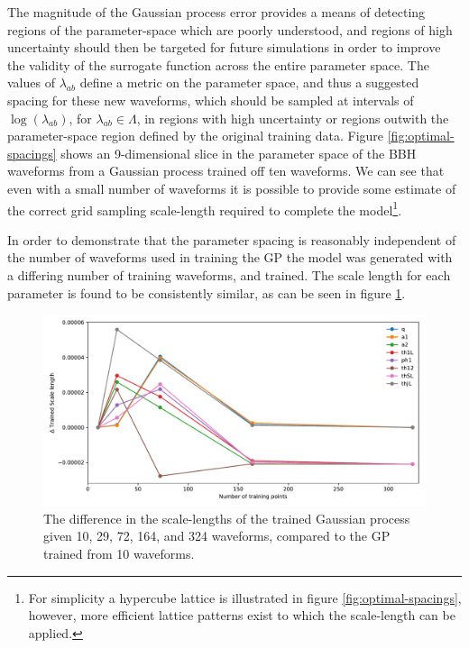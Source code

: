 \documentclass[openleft]{kentigern}
\theoremstyle{definition}
\begin{document}
The magnitude of the Gaussian process error provides a means of
detecting regions of the parameter-space which are poorly understood,
and regions of high uncertainty should then be targeted for future
simulations in order to improve the validity of the surrogate function
across the entire parameter space. The values of $\lambda_{ab}$ define
a metric on the parameter space, and thus a suggested spacing for
these new waveforms, which should be sampled at intervals of
$\log(\lambda_{ab})$, for $\lambda_{ab} \in \Lambda$, in regions with
high uncertainty or regions outwith the parameter-space region defined
by the original training data. Figure \ref{fig:optimal-spacings} shows an
9-dimensional slice in the parameter space of the BBH waveforms from a
Gaussian process trained off ten waveforms. We can see that even with
a small number of waveforms it is possible to provide some estimate of
the correct grid sampling scale-length required to complete the
model\footnote{For simplicity a hypercube lattice is illustrated in
  figure \ref{fig:optimal-spacings}, however, more efficient lattice patterns
  exist to which the scale-length can be applied.}.

In order to demonstrate that the parameter spacing is reasonably
independent of the number of waveforms used in training the GP the
model was generated with a differing number of training waveforms, and
trained. The scale length for each parameter is found to be
consistently similar, as can be seen in figure \ref{fig:convergence}.

\begin{figure}
  \centering
  \includegraphics[width=\textwidth]{figures/convergence.pdf}
  \caption{The difference in the scale-lengths of the trained Gaussian process given 10, 29, 72, 164, and 324 waveforms, compared to the GP trained from 10 waveforms.}
  \label{fig:convergence}
\end{figure}
\end{document}
